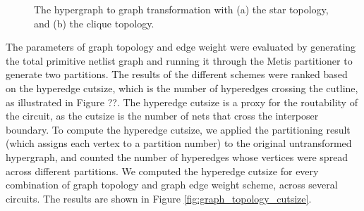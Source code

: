 \begin{figure}[!htbp]
\centering
{}
\caption{The hypergraph to graph transformation with (a) the star topology, and (b) the clique topology.}
\label{fig:hyperedge_to_graph}
\end{figure}

The parameters of graph topology and edge weight were evaluated by generating the total primitive netlist graph and running it through the Metis partitioner to generate two partitions. The results of the different schemes were ranked based on the hyperedge cutsize, which is the number of hyperedges crossing the cutline, as illustrated in Figure ??. The hyperedge cutsize is a proxy for the routability of the circuit, as the cutsize is the number of nets that cross the interposer boundary. To compute the hyperedge cutsize, we applied the partitioning result (which assigns each vertex to a partition number) to the original untransformed hypergraph, and counted the number of hyperedges whose vertices were spread across different partitions. We computed the hyperedge cutsize for every combination of graph topology and graph edge weight scheme, across several circuits. The results are shown in Figure \ref{fig:graph_topology_cutsize}.

